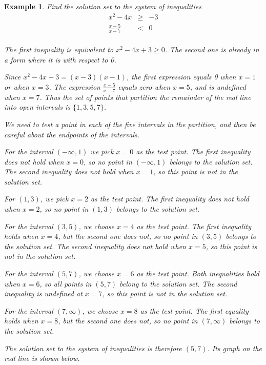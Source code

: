 \documentclass[11pt]{book}               %
\newtheorem{example}{Example}
\begin{document}
\begin{example}  Find the solution set to the system of inequalities
\begin{eqnarray*}
x^2 - 4x &\geq& -3\\
\frac{x-5}{x-7} &<& 0\\
\end{eqnarray*}

\normalfont
The first inequality is equivalent to $x^2 - 4x + 3 \geq 0$.  
The second one is already in a form where it is with respect to 0.

Since $x^2 - 4x + 3 = (x - 3)(x-1)$, the first expression equals 0 when $x = 1$ or when $x = 3$.
The expression $\frac{x-5}{x-7}$ equals zero when $x=5$, and is undefined when $x = 7$.
Thus the set of points that partition the remainder of the real line into open intervals 
is $\{1, 3, 5, 7\}$. 

We need to test a point in each of the five intervals in the partition, and then be careful about the endpoints of the intervals.

For the interval $(-\infty, 1)$ we pick $x = 0$ as the test point.  
The first inequality does not hold when $x = 0$, so no point in $(-\infty, 1)$ belongs to 
the solution set.
The second inequality does not hold when $x = 1$, so this point is not in the solution set.

For $(1, 3)$, we pick $x = 2$ as the test point.
The first inequality does not hold when $x = 2$, so no point in $(1, 3)$ belongs to 
the solution set.

For the interval $(3, 5)$, we choose $x = 4$ as the test point.
The first inequality holds when $x = 4$, but the second one does not, 
so no point in $(3, 5)$ belongs to the solution set.
The second inequality does not hold when $x = 5$, so this point is not in the solution set.

For the interval $(5, 7)$, we choose $x = 6$ as the test point.
Both inequalities hold when $x = 6$, so all points in $(5, 7)$ belong to the solution set.
The second inequality is undefined at $x = 7$, so this point is not in the solution set.

For the interval $(7, \infty)$, we choose $x = 8$ as the test point.
The first equality holds when $x = 8$, but the second one does not, 
so no point in $(7, \infty)$ belongs to the solution set.

The solution set to the system of inequalities is therefore $(5, 7)$.  Its graph on the real line is shown below.

\begin{center}


\end{center}
\end{example}
\end{document}
